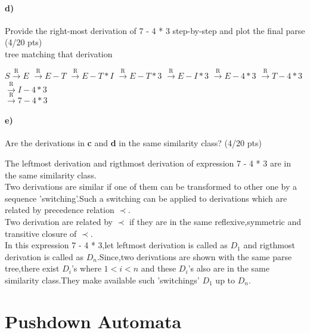 \documentclass[a4paper,12pt]{article}
\begin{document}
\paragraph{d)} Provide the right-most derivation of 7 - 4 * 3 step-by-step and plot the final parse \hfill \small{(4/20 pts)} \\
 tree matching that derivation \\
 
\begin{tcolorbox}
$S \xrightarrow{\text{R}} E$  $\xrightarrow{\text{R}} E-T$  $\xrightarrow{\text{R}} E-T*I$ $\xrightarrow{\text{R}} E-T*3$ $\xrightarrow{\text{R}} E-I*3$  $\xrightarrow{\text{R}} E-4*3$ $\xrightarrow{\text{R}} T-4*3$ $\xrightarrow{\text{R}} I-4*3$ \\ 

$\xrightarrow{\text{R}} 7-4*3$

\end{tcolorbox}


\paragraph{e)} Are the derivations in \textbf{c} and \textbf{d} in the same similarity class?  \hfill \small{(4/20 pts)} \\

\begin{tcolorbox}
The leftmost derivation and rigthmost derivation of expression 7 - 4 * 3 are in the same similarity class.\\
Two derivations are similar if one of them can be transformed to other one by a sequence 'switching'.Such a switching can be applied to derivations which are related by precedence relation $\prec$.\\ 
Two derivation are related by $\prec$ if they are in the same reflexive,symmetric and transitive closure of $\prec$.\\
In this expression 7 - 4 * 3,let leftmost derivation is called as $D_1$ and rigthmost derivation is called as $D_n$.Since,two derivations are shown with the same parse tree,there exist $D_i$'s where $1<i<n$ and these $D_i$'s also are in the same similarity class.They make available such 'switchings' $D_1$ up to $D_n$.

\end{tcolorbox}


\newpage
\section{Pushdown Automata \hfill {}}
\end{document}
